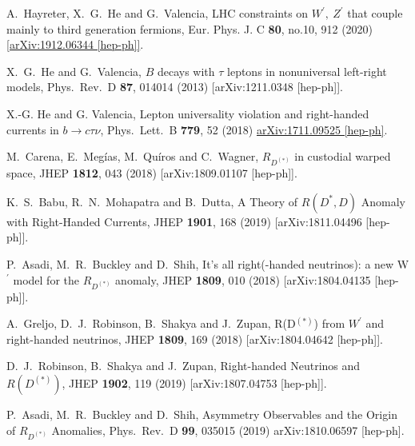 \documentclass[reprint,showpacs,aps,prd,nofootinbib,superscriptaddress,longbibliography]{revtex4-1}
\begin{document}
\begin{thebibliography}{99}

A.~Hayreter, X.~G.~He and G.~Valencia, LHC constraints on $W^\prime ,~Z^\prime $ that couple mainly to third generation fermions, Eur. Phys. J. C \textbf{80}, no.10, 912 (2020)
\href{http://arxiv.org/abs/1912.06344}{[arXiv:1912.06344 [hep-ph]]}.
  
X.~G.~He and G.~Valencia, $B$ decays with $\tau$ leptons in nonuniversal left-right models, Phys.\ Rev.\ D {\bf 87}, 014014 (2013)   [arXiv:1211.0348 [hep-ph]].

X.-G. He and G. Valencia, Lepton universality violation and right-handed currents in $b \to c \tau \nu$,  Phys.\ Lett.\ B {\bf 779}, 52 (2018) \href{http://arxiv.org/abs/1711.09525}{arXiv:1711.09525  [hep-ph]}.

  M.~Carena, E.~Meg\'{i}as, M.~Qu\'{i}ros and C.~Wagner, $ {R}_{D^{\left(*\right)}} $ in custodial warped space,  JHEP {\bf 1812}, 043 (2018) [arXiv:1809.01107 [hep-ph]].

K.~S.~Babu, R.~N.~Mohapatra and B.~Dutta, A Theory of $R(D^*,D)$ Anomaly with Right-Handed Currents,   JHEP {\bf 1901}, 168 (2019) [arXiv:1811.04496 [hep-ph]].
  
  P.~Asadi, M.~R.~Buckley and D.~Shih, It’s all right(-handed neutrinos): a new W$^{\prime}$ model for the $ {R}_{D^{{\left(\ast \right)}}} $ anomaly, JHEP {\bf 1809}, 010 (2018) [arXiv:1804.04135 [hep-ph]].  

  A.~Greljo, D.~J.~Robinson, B.~Shakya and J.~Zupan, R(D$^{(\ast)}$) from $W^{\prime}$ and right-handed neutrinos, JHEP {\bf 1809}, 169 (2018)  [arXiv:1804.04642 [hep-ph]].

D.~J.~Robinson, B.~Shakya and J.~Zupan, Right-handed Neutrinos and $R(D^{(*)})$, JHEP {\bf 1902}, 119 (2019) [arXiv:1807.04753 [hep-ph]].

P.~Asadi, M.~R.~Buckley and D.~Shih, Asymmetry Observables and the Origin of $R_{D^{(*)}}$ Anomalies, Phys.\ Rev.\ D {\bf 99}, 035015 (2019) arXiv:1810.06597 [hep-ph].
  

\end{thebibliography}
\end{document}
